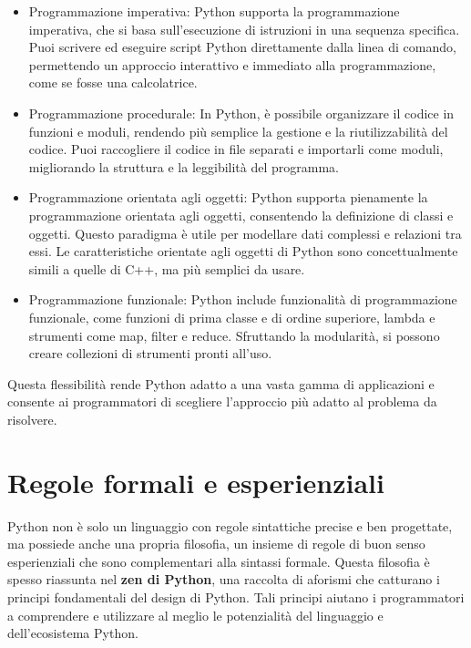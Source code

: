 \documentclass[
  letterpaper,
  DIV=11,
  numbers=noendperiod]{scrreprt}
\providecommand{\tightlist}{%
  \setlength{\itemsep}{0pt}\setlength{\parskip}{0pt}}\usepackage{longtable,booktabs,array}
\begin{document}
\begin{itemize}
\tightlist
\item
  Programmazione imperativa: Python supporta la programmazione
  imperativa, che si basa sull'esecuzione di istruzioni in una sequenza
  specifica. Puoi scrivere ed eseguire script Python direttamente dalla
  linea di comando, permettendo un approccio interattivo e immediato
  alla programmazione, come se fosse una calcolatrice.
\item
  Programmazione procedurale: In Python, è possibile organizzare il
  codice in funzioni e moduli, rendendo più semplice la gestione e la
  riutilizzabilità del codice. Puoi raccogliere il codice in file
  separati e importarli come moduli, migliorando la struttura e la
  leggibilità del programma.
\item
  Programmazione orientata agli oggetti: Python supporta pienamente la
  programmazione orientata agli oggetti, consentendo la definizione di
  classi e oggetti. Questo paradigma è utile per modellare dati
  complessi e relazioni tra essi. Le caratteristiche orientate agli
  oggetti di Python sono concettualmente simili a quelle di C++, ma più
  semplici da usare.
\item
  Programmazione funzionale: Python include funzionalità di
  programmazione funzionale, come funzioni di prima classe e di ordine
  superiore, lambda e strumenti come map, filter e reduce. Sfruttando la
  modularità, si possono creare collezioni di strumenti pronti all'uso.
\end{itemize}

Questa flessibilità rende Python adatto a una vasta gamma di
applicazioni e consente ai programmatori di scegliere l'approccio più
adatto al problema da risolvere.

\section{Regole formali e
esperienziali}\label{regole-formali-e-esperienziali}

Python non è solo un linguaggio con regole sintattiche precise e ben
progettate, ma possiede anche una propria filosofia, un insieme di
regole di buon senso esperienziali che sono complementari alla sintassi
formale. Questa filosofia è spesso riassunta nel \textbf{zen di Python},
una raccolta di aforismi che catturano i principi fondamentali del
design di Python. Tali principi aiutano i programmatori a comprendere e
utilizzare al meglio le potenzialità del linguaggio e dell'ecosistema
Python.
\end{document}
